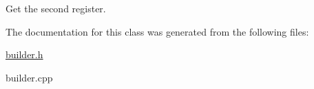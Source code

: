 Get the second register. 

The documentation for this class was generated from the following files\-:\begin{DoxyCompactItemize}
\item 
\hyperlink{builder_8h}{builder.\-h}\item 
builder.\-cpp\end{DoxyCompactItemize}
